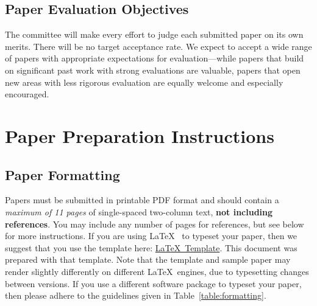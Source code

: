 \documentclass{sig-alternate}
\begin{document}
{\subsection{Paper Evaluation Objectives} 
The committee will make every effort to judge each submitted paper on its own merits. There will be no target acceptance rate. We expect to accept a wide range of papers with appropriate expectations for evaluation---while papers that build on significant past work with strong evaluations are valuable, papers that open new areas with less rigorous evaluation are equally welcome and especially encouraged.

\section{Paper Preparation Instructions}

\subsection{Paper Formatting}

Papers must be submitted in printable PDF format and should contain a {\em maximum of 11 pages} of single-spaced two-column text, {\bf not including references}.  You may include any number of pages for references, but see below for more instructions.  If you are using \LaTeX~\cite{lamport94} to typeset your paper, then we suggest that you use the template here: \href{https://www.microarch.org/micro55/submit/micro55-latex-template.zip}{\LaTeX~Template}. This document was prepared with that template. Note that the template and sample paper may render slightly differently on different \LaTeX~engines, due to typesetting changes between versions. If you use a different software package to typeset your paper, then please adhere to the guidelines given in Table~\ref{table:formatting}. 

}
\end{document}
